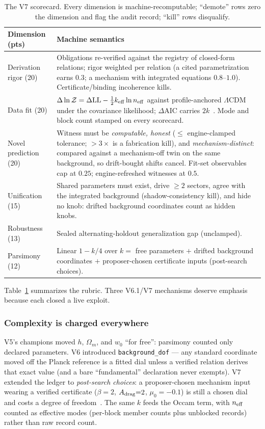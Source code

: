 \documentclass[journal]{IEEEtran}
\newcommand{\dlnz}{\Delta\ln\mathcal{Z}}
\begin{document}
\begin{table}[t]
\caption{The V7 scorecard. Every dimension is machine-recomputable; ``demote'' rows zero
the dimension and flag the audit record; ``kill'' rows disqualify.}
\label{tab:rubric}
\centering\footnotesize
\begin{tabular}{lp{5.2cm}}
\toprule
\textbf{Dimension (pts)} & \textbf{Machine semantics} \\
\midrule
Derivation rigor (20) & Obligations re-verified against the registry of closed-form
relations; rigor weighted per relation (a cited parametrization earns $0.3$; a mechanism
with integrated equations $0.8$--$1.0$). Certificate/binding incoherence kills. \\
Data fit (20) & $\dlnz = \Delta\mathrm{LL} - \tfrac{1}{2}k_{\rm eff}\ln n_{\rm eff}$
against profile-anchored $\Lambda$CDM under the covariance likelihood;
$\Delta$AIC carries $2k$~\cite{akaike1974,schwarz1978}. Mode and block count stamped on
every scorecard. \\
Novel prediction (20) & Witness must be \emph{computable, honest} ($\leq$ engine-clamped
tolerance; $>3\times$ is a fabrication kill), and \emph{mechanism-distinct}: compared
against a mechanism-off twin on the same background, so drift-bought shifts cancel.
Fit-set observables cap at $0.25$; engine-refreshed witnesses at $0.5$. \\
Unification (15) & Shared parameters must exist, drive $\geq 2$ sectors, agree with the
integrated background (shadow-consistency kill), and hide no knob: drifted background
coordinates count as hidden knobs. \\
Robustness (13) & Sealed alternating-holdout generalization gap (unclamped). \\
Parsimony (12) & Linear $1 - k/4$ over $k =$ free parameters $+$ drifted background
coordinates $+$ proposer-chosen certificate inputs (post-search choices). \\
\bottomrule
\end{tabular}
\end{table}

Table~\ref{tab:rubric} summarizes the rubric. Three V6.1/V7 mechanisms deserve emphasis
because each closed a live exploit.

\subsubsection{Complexity is charged everywhere}
V5's champions moved $h$, $\Omega_m$, and $w_0$ ``for free'': parsimony counted only
declared parameters. V6 introduced \texttt{background\_dof} --- any standard coordinate
moved off the Planck reference is a fitted dial unless a verified relation derives that
exact value (and a bare ``fundamental'' declaration never exempts). V7 extended the
ledger to \emph{post-search choices}: a proposer-chosen mechanism input wearing a
verified certificate ($\beta{=}2$, $A_{\rm drag}{=}2$, $\mu_0{=}-0.1$) is still a chosen
dial and costs a degree of freedom~\cite{burnham2004}. The same $k$ feeds the Occam term,
with $n_{\rm eff}$ counted as effective modes (per-block member counts plus unblocked
records) rather than raw record count.
\end{document}
